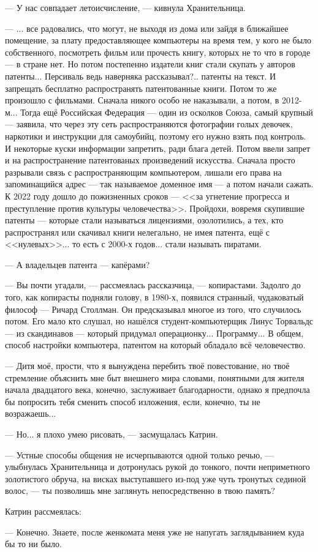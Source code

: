 --- У нас совпадает летоисчисление, --- кивнула Хранительница.

--- ... все радовались, что могут, не выходя из дома или зайдя в ближайшее помещение,
за плату предоставляющее компьютеры на время тем, у кого не было собственного, посмотреть фильм или прочесть книгу,
которых не то что в городе --- в стране нет.
Но потом постепенно издатели книг стали скупать у авторов патенты... Персиваль ведь наверняка рассказывал?.. патенты на текст.
И запрещать бесплатно распространять патентованные книги.
Потом то же произошло с фильмами. Сначала никого особо не наказывали, а потом, в 2012-м...
Тогда ещё Российская Федерация --- один из осколков Союза, самый крупный --- заявила,
что через эту сеть распространяются фотографии голых девочек, наркотики и инструкции для самоубийц,
поэтому его нужно взять под контроль. И некоторые куски информации запретить, ради блага детей.
Потом ввели запрет и на распространение патентованых произведений искусства.
Сначала просто разрывали связь с распространяющим компьютером,
лишали его права на запоминащийся адрес --- так называемое доменное имя --- а потом начали сажать.
К 2022 году дошло до пожизненных сроков --- <<за угнетение прогресса и преступление против культуры человечества>>.
Пройдохи, вовремя скупившие патенты --- которые стали называться лицензиями, озолотились, а тех,
кто распространял или скачивал книги нелегально, не имея патента, ещё с <<нулевых>>...
то есть с 2000-х годов... стали называть пиратами.

--- А владельцев патента --- капёрами?

--- Вы почти угадали, --- рассмеялась рассказчица, --- копирастами. Задолго до того, как копирасты подняли голову,
в 1980-х, появился странный, чудаковатый философ --- Ричард Столлман.
Он предсказывал многое из того, что случилось потом.
Его мало кто слушал, но нашёлся студент-компьютерщик Линус Торвальдс --- из скандинавов --- который придумал операционку...
Программу... В общем, способ настройки компьютера, патентом на который обладало всё человечество.

--- Дитя моё, прости, что я вынуждена перебить твоё повестование, но твоё стремление объяснить мне быт внешнего мира словами,
понятными для жителя начала двадцатого века, конечно, заслуживает благодарности,
однако я предпочла бы попросить тебя сменить способ изложения, если, конечно, ты не возражаешь...

--- Но... я плохо умею рисовать, --- засмущалась Катрин.

--- Устные способы общения не исчерпываются одной только речью, ---
улыбнулась Хранительница и дотронулась рукой до тонкого, почти неприметного золотистого обруча,
на висках выступавшего из-под уже чуть тронутых сединой волос, --- ты позволишь мне заглянуть непосредственно в твою память?

Катрин рассмеялась:

--- Конечно. Знаете, после женкомата меня уже не напугать заглядыванием куда бы то ни было.

\emptypar
